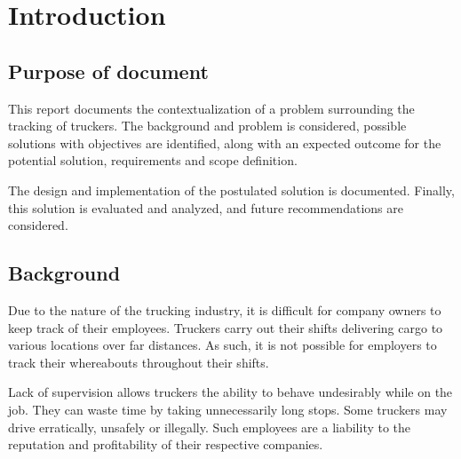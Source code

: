 \section{Introduction}
\subsection{Purpose of document}
This report documents the contextualization of a problem surrounding the tracking of truckers.
The background and problem is considered, possible solutions with objectives are identified, along with an expected outcome for the potential solution, requirements and scope definition.

The design and implementation of the postulated solution is documented.
Finally, this solution is evaluated and analyzed, and future recommendations are considered.

\subsection{Background}
Due to the nature of the trucking industry, it is difficult for company owners to keep track of their employees.
Truckers carry out their shifts delivering cargo to various locations over far distances.
As such, it is not possible for employers to track their whereabouts throughout their shifts.

Lack of supervision allows truckers the ability to behave undesirably while on the job.
They can waste time by taking unnecessarily long stops.
Some truckers may drive erratically, unsafely or illegally.
Such employees are a liability to the reputation and profitability of their respective companies.

